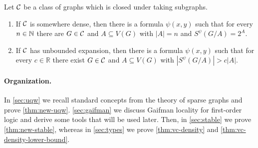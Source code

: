 \begin{theorem}\label{thm:vc-density-lower-bound}
Let $\mathcal{C}$ be a class of graphs which 
is closed under taking subgraphs. 
\begin{enumerate}[(1)]
\item If $\mathcal{C}$ is somewhere dense, then there is a formula 
$\psi(x,y)$ such that for every $n\in \mathbb{N}$ there are $G\in\mathcal{C}$ and $A\subseteq V(G)$ 
with $|A|=n$ and $S^\psi(G/A)=2^{A}$. 
\item If $\mathcal{C}$ has unbounded expansion, then there is a formula 
$\psi(x,y)$ such that for every $c\in \mathbb{R}$ there exist $G\in\mathcal{C}$ and $A\subseteq V(G)$ with $|S^\psi(G/A)|>c|A|$. 
\end{enumerate}
\end{theorem}

\paragraph{Organization.} In \cref{sec:uqw} we recall standard concepts from the theory of sparse graphs and prove \cref{thm:new-uqw}.
\cref{sec:gaifman} we discuss Gaifman locality for first-order logic and derive some tools that will be used later.
Then, in \cref{sec:stable} we prove \cref{thm:new-stable}, whereas in \cref{sec:types} we prove \cref{thm:vc-density} and \cref{thm:vc-density-lower-bound}.




%




